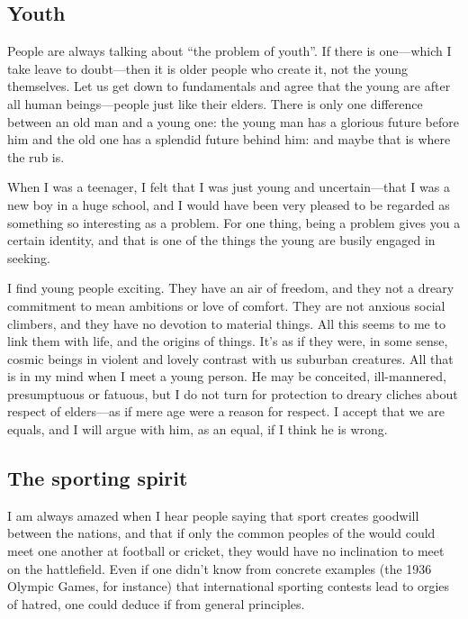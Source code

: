 \documentclass[11pt]{article}
\begin{document}
\subsection{Youth}
\label{sec-2-5}

People are always talking about ``the problem of youth''. If there is one---which I take leave to doubt---then it is older people who create it, not the young themselves. Let us get down to fundamentals and agree that the young are after all human beings---people just like their elders. There is only one difference between an old man and a young one: the young man has a glorious future before him and the old one has a splendid future behind him: and maybe that is where the rub is.

When I was a teenager, I felt that I was just young and uncertain---that I was a new boy in a huge school, and I would have been very pleased to be regarded as something so interesting as a problem. For one thing, being a problem gives you a certain identity, and that is one of the things the young are busily engaged in seeking.

I find young people exciting. They have an air of freedom, and they not a dreary commitment to mean ambitions or love of comfort. They are not anxious social climbers, and they have no devotion to material things. All this seems to me to link them with life, and the origins of things. It's as if they were, in some sense, cosmic beings in violent and lovely contrast with us suburban creatures. All that is in my mind when I meet a young person. He may be conceited, ill-mannered, presumptuous or fatuous, but I do not turn for protection to dreary cliches about respect of elders---as if mere age were a reason for respect. I accept that we are equals, and I will argue with him, as an equal, if I think he is wrong.
\subsection{The sporting spirit}
\label{sec-2-6}

I am always amazed when I hear people saying that sport creates goodwill between the nations, and that if only the common peoples of the would could meet one another at football or cricket, they would have no inclination to meet on the hattlefield. Even if one didn't know from concrete examples (the 1936 Olympic Games, for instance) that international sporting contests lead to orgies of hatred, one could deduce if from general principles.
\end{document}
